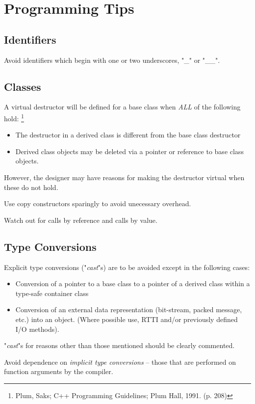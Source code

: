 \chapter{Programming Tips\label{Coding.Tips}}
\section{Identifiers}
Avoid identifiers which begin with one or two underscores, "\_" or
"\_\_".

\section{Classes}
A virtual destructor will be defined for a base class when {\em ALL} of the
following hold:
\footnote{Plum, Saks; C++ Programming Guidelines; Plum Hall, 1991. (p. 208)}
\begin{itemize}
\item
The destructor in a derived class is different from the base class
destructor
\item
Derived class objects may be deleted via a pointer or reference to
base class objects.
\end{itemize}
However, the designer may have reasons for making the destructor
virtual when these do not hold.


Use copy constructors sparingly to avoid unecessary overhead.

Watch out for calls by reference and calls by value.

\section{Type Conversions}
Explicit type conversions ("{\em cast}"s) are to be avoided except in the
following cases:
\begin{itemize}
\item
Conversion of a pointer to a base class to a pointer of a derived
class within a type-safe container class
\item
Conversion of an external data representation (bit-stream, packed
message, etc.) into an object.  (Where possible use, RTTI and/or
previously defined I/O methods).
\end{itemize}
"{\em cast}"s for reasons other than those mentioned should be clearly
commented.

Avoid dependence on {\it implicit type conversions} -- those that are
performed on function arguments by the compiler.


